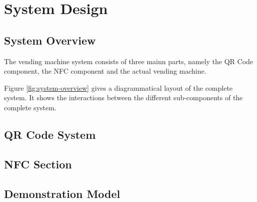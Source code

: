 \chapter{System Design}

\section{System Overview}

The vending machine system consists of three mainn parts, namely the QR Code component, the NFC
component and the actual vending machine. 

Figure \ref{fig:system-overview} gives a diagrammatical layout of the complete system. It shows
the interactions between the different sub-components of the complete system.

\section{QR Code System}

\section{NFC Section}

\section{Demonstration Model}